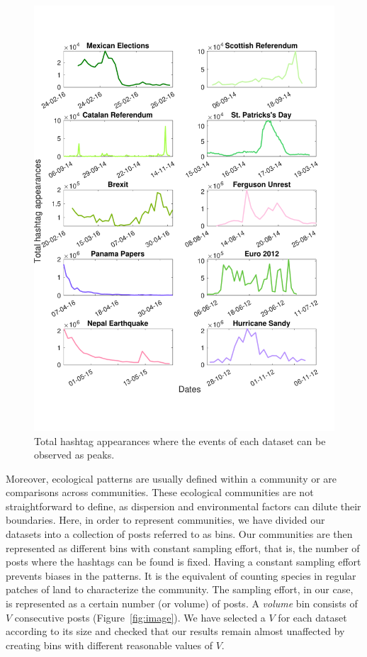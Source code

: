 \begin{figure}[t]
     \centering
\includegraphics[width=\columnwidth]{figures/chp4/total_abuncances_vertical.pdf}
 \caption[Total hashtag abundances]{ Total hashtag appearances where the events of each dataset can be observed as peaks. }
\label{fig:4:totabun}
\end{figure}

Moreover, ecological patterns are usually defined within a community or are comparisons across communities.  These ecological communities are not straightforward to define, as dispersion and environmental factors can dilute their boundaries. Here, in order to represent communities, we have divided our datasets into a collection of posts referred to as bins. Our communities are then represented as different bins with constant sampling effort, that is, the number of posts where the hashtags can be found is fixed. Having a constant sampling effort prevents biases in the patterns. It is the equivalent of counting species in regular patches of land to characterize the community. The sampling effort, in our case, is represented as a certain number (or volume) of posts. A \textit{volume} bin consists of $V$ consecutive posts (Figure~\ref{fig:image}). We have selected a $V$ for each dataset according to its size and checked that our results remain almost unaffected by creating bins with different reasonable values of $V$. \\




